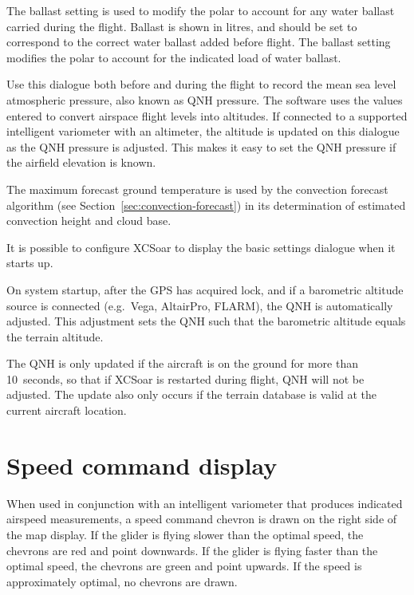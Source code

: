 The ballast setting is used to modify the polar to account for any
water ballast carried during the flight. Ballast is shown in litres,
and should be set to correspond to the correct water ballast added
before flight.  The ballast setting modifies the polar to account for
the indicated load of water ballast.

Use this dialogue both before and during the flight to record the mean
sea level atmospheric pressure, also known as QNH pressure.  The
software uses the values entered to convert airspace flight levels
into altitudes.  If connected to a supported intelligent variometer
with an altimeter, the altitude is updated on this dialogue as the QNH
pressure is adjusted.  This makes it easy to set the QNH pressure if
the airfield elevation is known.

The maximum forecast ground temperature is used by the convection
forecast algorithm (see Section~\ref{sec:convection-forecast}) in its
determination of estimated convection height and cloud base.

\tip{} It is possible to configure XCSoar to display the basic
settings dialogue when it starts up.

On system startup, after the GPS has acquired lock, and if a
barometric altitude source is connected (e.g.\ Vega, AltairPro,
FLARM), the QNH is automatically adjusted.  This adjustment sets the
QNH such that the barometric altitude equals the terrain altitude.

The QNH is only updated if the aircraft is on the ground for more than
10~seconds, so that if XCSoar is restarted during flight, QNH will not
be adjusted.  The update also only occurs if the terrain database is
valid at the current aircraft location.

\section{Speed command display}

When used in conjunction with an intelligent variometer that produces
indicated airspeed measurements, a speed command chevron is drawn
on the right side of the map display.  If the glider is flying slower
than the optimal speed, the chevrons are red and point downwards.  If
the glider is flying faster than the optimal speed, the chevrons are
green and point upwards.  If the speed is approximately optimal, no
chevrons are drawn.


